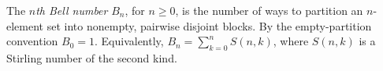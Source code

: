 
The \emph{$n$th Bell number} $B_n$, for $n\ge0$, is the number of ways to partition an $n$-element set into nonempty, pairwise disjoint blocks. By the empty-partition convention $B_0=1$. Equivalently, $B_n=\sum_{k=0}^n S(n,k)$, where $S(n,k)$ is a Stirling number of the second kind.
